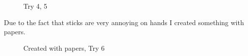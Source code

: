 \documentclass{report}
\begin{document}
\begin{figure}
	\caption{Try 4, 5}
\end{figure}

Due to the fact that sticks are very annoying on hands I created something with papers.

\begin{figure}
	\caption{Created with papers, Try 6}
\end{figure}
\end{document}
